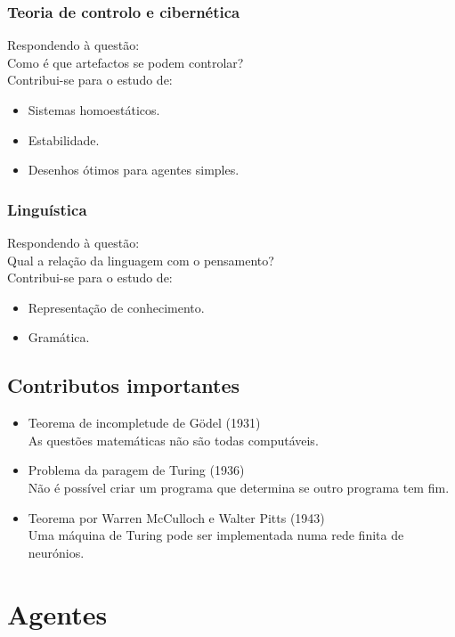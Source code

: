 \documentclass[]{report}
\begin{document}
\begin{multicols}{2}
\subsection{Teoria de controlo e cibernética}
Respondendo à questão:\\
\indent Como é que artefactos se podem controlar?\\
Contribui-se para o estudo de:
\begin{itemize}
	\item Sistemas homoestáticos.
	\item Estabilidade.
	\item Desenhos ótimos para agentes simples.
\end{itemize}
\subsection{Linguística}
Respondendo à questão:\\
\indent Qual a relação da linguagem com o pensamento?\\
Contribui-se para o estudo de:
\begin{itemize}
\item Representação de conhecimento.
\item Gramática.
\end{itemize}
\end{multicols}
\section{Contributos importantes}
\begin{itemize}
	\item Teorema de incompletude de Gödel (1931)\\
	As questões matemáticas não são todas computáveis.
	\item Problema da paragem de Turing (1936)\\
	Não é possível criar um programa que determina se outro programa tem fim.
	\item Teorema por Warren McCulloch e Walter Pitts (1943)\\
	Uma máquina de Turing pode ser implementada numa rede finita de neurónios.
\end{itemize}
\chapter{Agentes}
\end{document}
